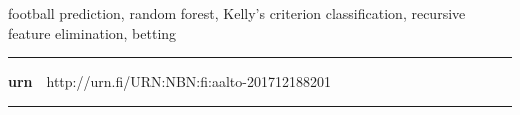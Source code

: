 \begin{spacing}{.88}
{\parindent0pt %

\parbox[t]{123.6mm}{\raggedright\small football prediction, random forest, Kelly's criterion  classification, recursive feature elimination, betting}

\vspace{.5mm}\rule{\textwidth}{.75pt}

{\fontsize{10.5pt}{10.5pt}\bfseries\sffamily\lsstyle urn}~~{\small http://urn.fi/URN:NBN:fi:aalto-201712188201}

\vspace{-2.4mm}\rule{\textwidth}{.75pt}

} %
\end{spacing}




\newpage
{}
{}


